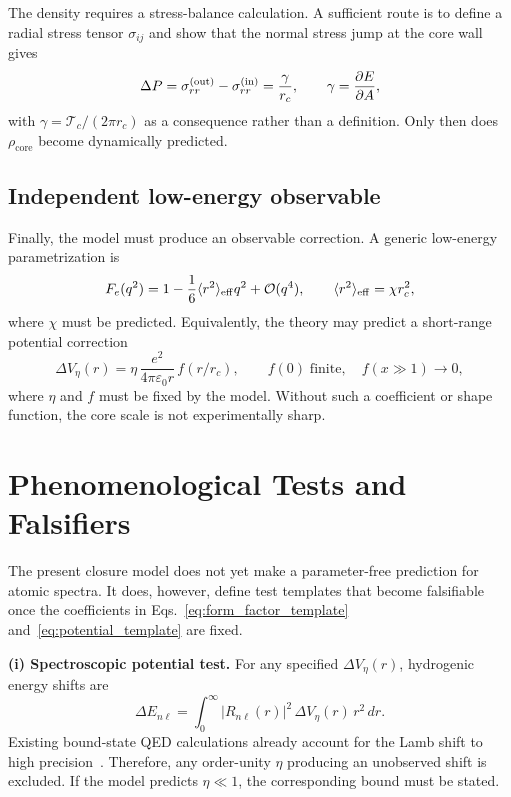 \documentclass[aps,pra,preprint,longbibliography,nofootinbib]{revtex4-2}
\begin{document}
The density requires a stress-balance calculation.  A sufficient route is
to define a radial stress tensor $\sigma_{ij}$ and show that the normal
stress jump at the core wall gives
\begin{equation}
  \Delta P = \sigma_{rr}^{\rm(out)}-\sigma_{rr}^{\rm(in)}
           = \frac{\gamma}{r_c},
  \qquad
  \gamma = \frac{\partial E}{\partial A},
  \label{eq:needed_laplace}
\end{equation}
with $\gamma=\mathcal{T}_c/(2\pi r_c)$ as a consequence rather than a
definition.  Only then does $\rho_{\mathrm{core}}$ become dynamically
predicted.

\subsection{Independent low-energy observable}

Finally, the model must produce an observable correction.  A generic
low-energy parametrization is
\begin{equation}
  F_e(q^2)=1-\frac{1}{6}\langle r^2\rangle_{\rm eff}q^2+\mathcal{O}(q^4),
  \qquad
  \langle r^2\rangle_{\rm eff}=\chi r_c^2,
  \label{eq:form_factor_template}
\end{equation}
where $\chi$ must be predicted.  Equivalently, the theory may predict a
short-range potential correction
\begin{equation}
  \Delta V_\eta(r)=
  \eta\,\frac{e^2}{4\pi\varepsilon_0 r}\,f(r/r_c),
  \qquad f(0)\;\mathrm{finite},\quad f(x\gg1)\to0,
  \label{eq:potential_template}
\end{equation}
where $\eta$ and $f$ must be fixed by the model.  Without such a
coefficient or shape function, the core scale is not experimentally
sharp.

\section{Phenomenological Tests and Falsifiers}
\label{sec:falsifiers}

The present closure model does not yet make a parameter-free prediction
for atomic spectra.  It does, however, define test templates that become
falsifiable once the coefficients in Eqs.~\eqref{eq:form_factor_template}
and~\eqref{eq:potential_template} are fixed.

\medskip
\noindent\textbf{(i) Spectroscopic potential test.}
For any specified $\Delta V_\eta(r)$, hydrogenic energy shifts are
\begin{equation}
  \Delta E_{n\ell}
  = \int_0^\infty |R_{n\ell}(r)|^2\,\Delta V_\eta(r)\,r^2\,dr.
  \label{eq:lamb_template}
\end{equation}
Existing bound-state QED calculations already account for the Lamb
shift to high precision~\cite{Bethe1947,Karshenboim2005}.  Therefore,
any order-unity $\eta$ producing an unobserved shift is excluded.  If the
model predicts $\eta\ll1$, the corresponding bound must be stated.
\end{document}
